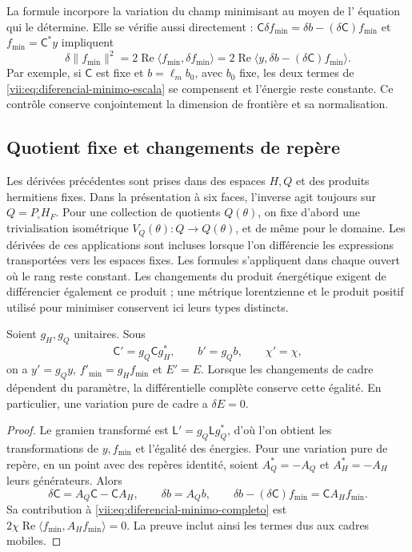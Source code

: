 La formule incorpore la variation du champ minimisant au moyen de l'
équation qui le détermine. Elle se vérifie aussi directement :
\(\mathsf C\delta f_{\min}=\delta b-(\delta\mathsf C)f_{\min}\)
et \(f_{\min}=\mathsf C^*y\) impliquent
\[
 \delta\|f_{\min}\|^2
 =2\operatorname{Re}\langle f_{\min},\delta f_{\min}\rangle
 =2\operatorname{Re}
     \langle y,\delta b-(\delta\mathsf C)f_{\min}\rangle.
\]
Par exemple, si \(\mathsf C\) est fixe et \(b=\ell_m b_0\), avec
\(b_0\) fixe, les deux termes de
\eqref{vii:eq:diferencial-minimo-escala} se compensent et l'énergie
reste constante. Ce contrôle conserve conjointement la dimension
de frontière et sa normalisation.

\subsection{Quotient fixe et changements de repère}
\label{vii:subsec:marcos-minimo}

Les dérivées précédentes sont prises dans des espaces \(H,Q\) et des produits hermitiens fixes. Dans la présentation à six faces, l'inverse agit toujours sur \(Q=P_\square H_F\). Pour une collection de quotients \(Q(\theta)\), on fixe d'abord une trivialisation isométrique \(V_Q(\theta):Q\to Q(\theta)\), et de même pour le domaine. Les dérivées de ces applications sont incluses lorsque l'on différencie les expressions transportées vers les espaces fixes. Les formules s'appliquent dans chaque ouvert où le rang reste constant. Les changements du produit énergétique exigent de différencier également ce produit ; une métrique lorentzienne et le produit positif utilisé pour minimiser conservent ici leurs types distincts.

\begin{proposition}
\label{vii:prop:covariancia-minimo}
Soient \(g_H,g_Q\) unitaires. Sous
\[
 \mathsf C'=g_Q\mathsf C g_H^*,\qquad b'=g_Qb,\qquad \chi'=\chi,
\]
on a \(y'=g_Qy\), \(f'_{\min}=g_Hf_{\min}\) et \(E'=E\).
Lorsque les changements de cadre dépendent du paramètre, la différentielle
complète conserve cette égalité. En particulier, une variation pure de
cadre a \(\delta E=0\).
\end{proposition}

\begin{proof}
Le gramien transformé est \(\mathsf L'=g_Q\mathsf Lg_Q^*\),
d'où l'on obtient les transformations de \(y,f_{\min}\) et
l'égalité des énergies. Pour une variation pure de repère, en un point
avec des repères identité, soient \(A_Q^*=-A_Q\) et \(A_H^*=-A_H\)
leurs générateurs. Alors
\[
 \delta\mathsf C=A_Q\mathsf C-\mathsf C A_H,\qquad
 \delta b=A_Qb,\qquad
 \delta b-(\delta\mathsf C)f_{\min}=\mathsf C A_Hf_{\min}.
\]
Sa contribution à \eqref{vii:eq:diferencial-minimo-completo} est
\(2\chi\operatorname{Re}\langle f_{\min},A_Hf_{\min}\rangle=0\).
La preuve inclut ainsi les termes dus aux cadres mobiles.
\end{proof}

